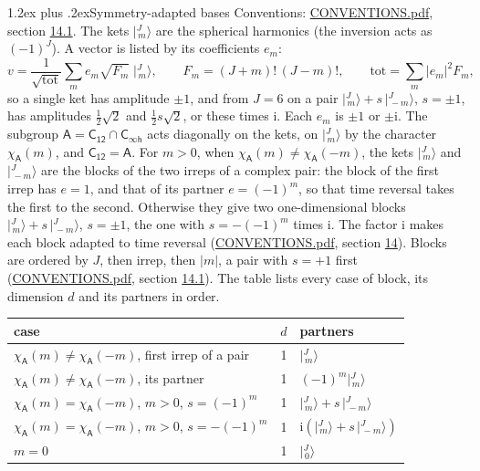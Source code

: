 \documentclass[10pt,a4paper]{article}
\makeatletter
\renewcommand\section{\@startsection{section}{1}{\z@}{-3ex plus -1ex minus -.2ex}%
  {1.2ex plus .2ex}{\normalfont\large\sffamily\bfseries\color{parttitle}}}
\numberwithin{equation}{section}
\newcommand{\grp}[1]{\mathsf{#1}}
\newcommand{\iunit}{\mathrm{i}}
\newcommand{\chiA}{\chi_{\grp{A}}}
\newcommand{\jm}[2]{\bigl\lvert{}^{#1}_{\,#2}\bigr\rangle}
\makeatother
\begin{document}
\section{Symmetry-adapted bases}\label{s:bases}
Conventions: \href{../../CONVENTIONS.pdf}{CONVENTIONS.pdf}, section \href{../../CONVENTIONS.pdf\#conv.14.1}{14.1}.
\leavevmode\label{n:index.m}\label{n:vector.ket}The kets $\jm{J}{m}$ are the spherical harmonics (the inversion acts as $(-1)^J$). \label{n:index.ketcoefficient}\label{n:vector.basis.symmetry}\label{n:index.ketweight}\label{n:index.total}A vector is listed by its coefficients $e_m$:
\begin{equation}\label{e:ket}v = \frac{1}{\sqrt{\mathrm{tot}}}\sum_m e_m\sqrt{F_m}\;\jm{J}{m},\qquad F_m = (J+m)!\,(J-m)!,\qquad \mathrm{tot} = \sum_m |e_m|^2F_m,\end{equation}
\leavevmode\label{n:index.pair.sign}so a single ket has amplitude $\pm1$, and from $J = 6$ on a pair $\jm{J}{m} + s\,\jm{J}{-m}$, $s = \pm1$, has amplitudes $\tfrac{1}{2}\sqrt{2}$ and $\tfrac{1}{2}s\sqrt{2}$, or these times $\iunit$. Each $e_m$ is $\pm1$ or $\pm\iunit$.
\leavevmode\label{n:group.A}\label{n:function.character.abelian}The subgroup $\grp{A} = \grp{C_{12}}\cap\grp{C_{\infty h}}$ acts diagonally on the kets, on $\jm{J}{m}$ by the character $\chiA(m)$, and $\grp{C_{12}} = \grp{A}$. For $m > 0$, when $\chiA(m) \ne \chiA(-m)$, the kets $\jm{J}{m}$ and $\jm{J}{-m}$ are the blocks of the two irreps of a complex pair: the block of the first irrep has $e = 1$, and that of its partner $e = (-1)^m$, so that time reversal takes the first to the second. Otherwise they give two one-dimensional blocks $\jm{J}{m} + s\,\jm{J}{-m}$, $s = \pm1$, the one with $s = -(-1)^m$ times $\iunit$. The factor $\iunit$ makes each block adapted to time reversal (\href{../../CONVENTIONS.pdf}{CONVENTIONS.pdf}, section \href{../../CONVENTIONS.pdf\#conv.14}{14}). Blocks are ordered by $J$, then irrep, then $|m|$, a pair with $s = +1$ first (\href{../../CONVENTIONS.pdf}{CONVENTIONS.pdf}, section \href{../../CONVENTIONS.pdf\#conv.14.1}{14.1}).
\leavevmode\label{n:head.case}\label{n:head.partners}The table lists every case of block, its dimension $d$ and its partners in order.
\begin{center}\begin{tabular}{@{}lrl@{}}\toprule
case & $d$ & partners\\\midrule
$\chiA(m) \ne \chiA(-m)$, first irrep of a pair & 1 & $\jm{J}{m}$\\
$\chiA(m) \ne \chiA(-m)$, its partner & 1 & $(-1)^m\jm{J}{m}$\\
$\chiA(m) = \chiA(-m)$, $m > 0$, $s = (-1)^m$ & 1 & $\jm{J}{m} + s\,\jm{J}{-m}$\\
$\chiA(m) = \chiA(-m)$, $m > 0$, $s = -(-1)^m$ & 1 & $\iunit(\jm{J}{m} + s\,\jm{J}{-m})$\\
$m = 0$ & 1 & $\jm{J}{0}$\\
\bottomrule\end{tabular}\end{center}
\end{document}
